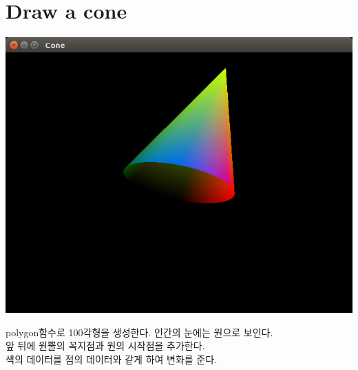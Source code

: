 \documentclass[12pt,a4paper]{article}
\begin{document}
\section{Draw a cone}
\includegraphics[width=\textwidth]{1.png}
	
polygon함수로 100각형을 생성한다. 인간의 눈에는 원으로 보인다.\\
앞 뒤에 원뿔의 꼭지점과 원의 시작점을 추가한다.\\
색의 데이터를 점의 데이터와 같게 하여 변화를 준다.\\




	
\end{document}
